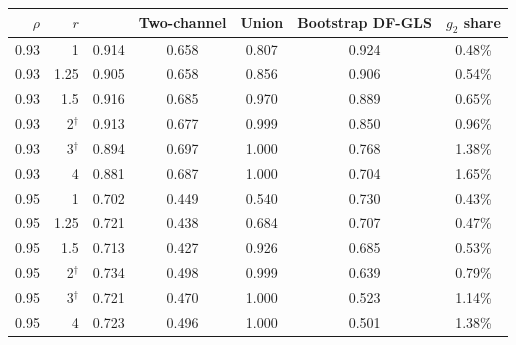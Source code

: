 \begin{tabular}{rrccccc}
\toprule
$\rho$ & $r$ & \RMGLS{} & Two-channel & Union & Bootstrap DF-GLS & $g_2$ share \\
\midrule
0.93 & 1 & 0.914 & 0.658 & 0.807 & 0.924 & 0.48\% \\
0.93 & 1.25 & 0.905 & 0.658 & 0.856 & 0.906 & 0.54\% \\
0.93 & 1.5 & 0.916 & 0.685 & 0.970 & 0.889 & 0.65\% \\
0.93 & 2$^\dagger$ & 0.913 & 0.677 & 0.999 & 0.850 & 0.96\% \\
0.93 & 3$^\dagger$ & 0.894 & 0.697 & 1.000 & 0.768 & 1.38\% \\
0.93 & 4 & 0.881 & 0.687 & 1.000 & 0.704 & 1.65\% \\
0.95 & 1 & 0.702 & 0.449 & 0.540 & 0.730 & 0.43\% \\
0.95 & 1.25 & 0.721 & 0.438 & 0.684 & 0.707 & 0.47\% \\
0.95 & 1.5 & 0.713 & 0.427 & 0.926 & 0.685 & 0.53\% \\
0.95 & 2$^\dagger$ & 0.734 & 0.498 & 0.999 & 0.639 & 0.79\% \\
0.95 & 3$^\dagger$ & 0.721 & 0.470 & 1.000 & 0.523 & 1.14\% \\
0.95 & 4 & 0.723 & 0.496 & 1.000 & 0.501 & 1.38\% \\
\bottomrule
\end{tabular}

